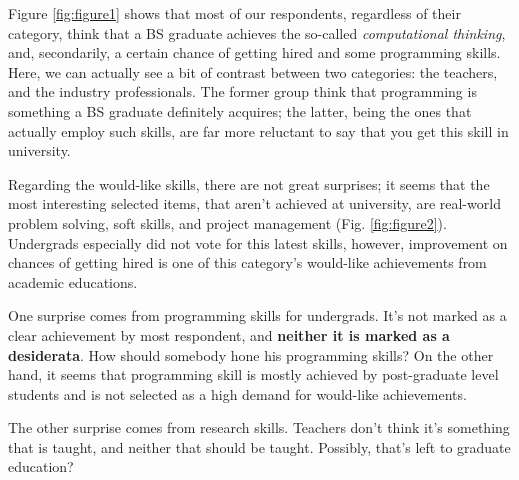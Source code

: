 \documentclass{sigchi}
\begin{document}
Figure \ref{fig:figure1} shows that most of our respondents, regardless of their category, think that a BS graduate achieves the so-called \textit{computational thinking}, and, secondarily, a certain chance of getting hired and some programming skills. Here, we can actually see a bit of contrast between two categories: the teachers, and the industry professionals. The former group think that programming is something a BS graduate definitely acquires; the latter, being the ones that actually employ such skills, are far more reluctant to say that you get this skill in university.

Regarding the would-like skills, there are not great surprises; it seems that the most interesting selected items, that aren't achieved at university, are real-world problem solving, soft skills, and project management (Fig. \ref{fig:figure2}). Undergrads especially did not vote for this latest skills, however, improvement on chances of getting hired is one of this category's would-like achievements from academic educations.

One surprise comes from programming skills for undergrads. It's not marked as a clear achievement by most respondent, and \textbf{neither it is marked as a desiderata}. How should somebody hone his programming skills? On the other hand, it seems that programming skill is mostly achieved by post-graduate level students and is not selected as a high demand for would-like achievements. 

The other surprise comes from research skills. Teachers don't think it's something that is taught, and neither that should be taught. Possibly, that's left to graduate education?
\end{document}
